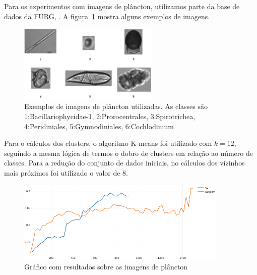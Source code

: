 Para os experimentos com imagens de plâncton, utilizamos parte da base de dados da FURG, . A figura~\ref{fig:Plancton_Exemplos} mostra alguns exemplos de imagens.


\begin{figure}
  \centering
  \includegraphics[width=0.6\textwidth]{figures/Plancton_Exemplos.png}
  \caption{Exemplos de imagens de plâncton utilizadas. As classes são 1:Bacillariophycidae-1, 2:Prorocentrales, 3:Spirotrichea, 4:Peridiniales, 5:Gymnodiniales, 6:Cochlodinium}
  \label{fig:Plancton_Exemplos}
\end{figure}


Para o cálculos dos clusters, o algoritmo K-means foi utilizado com $k=12$, seguindo a mesma lógica de termos o dobro de clusters em relação ao número de classes. Para a redução do conjunto de dados iniciais, no cálculos dos vizinhos mais próximos foi utilizado o valor de 8. 


\begin{figure}
  \centering
  \includegraphics[width=0.9\textwidth]{figures/grafico_exemplo_plancton.png}
  \caption{Gráfico com resultados sobre as imagens de plâncton}
  \label{fig:grafico_exemplo_plancton}
\end{figure}

